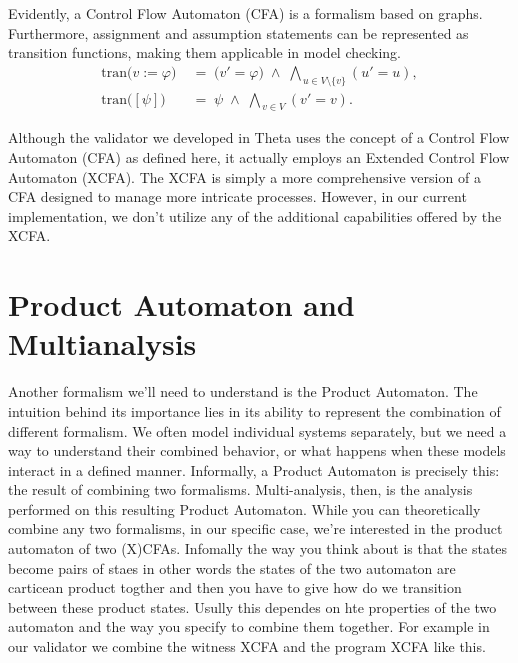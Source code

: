 Evidently, a Control Flow Automaton (CFA) is a formalism based on graphs. 
Furthermore, assignment and assumption statements can be represented as transition functions, 
making them applicable in model checking.
\begin{align}
\mathrm{tran}\bigl(v := \varphi\bigr)
&\;=\;
\bigl(v' = \varphi\bigr)
\;\land\;
\bigwedge_{\,u \in V \setminus \{v\}} (u' = u),
\\
\mathrm{tran}\bigl([\psi]\bigr)
&\;=\;
\psi
\;\land\;
\bigwedge_{\,v \in V} (v' = v).
\end{align}

Although the validator we developed in Theta uses the concept of a Control Flow Automaton (CFA) as 
defined here, it actually employs an Extended Control Flow Automaton (XCFA). The XCFA is simply 
a more comprehensive version of a CFA designed to manage more intricate processes. However, in 
our current implementation, we don't utilize any of the additional capabilities offered by the XCFA.



\section{Product Automaton and Multianalysis}
Another formalism we'll need to understand is the Product Automaton. The intuition behind its 
importance lies in its ability to represent the combination of different formalism. We 
often model individual systems separately, but we need a way to understand their combined behavior, 
or what happens when these models interact in a defined manner. Informally, a Product 
Automaton is precisely this: the result of combining two formalisms. Multi-analysis, then,
is the analysis performed on this resulting Product Automaton. While you can theoretically 
combine any two formalisms, in our specific case, we're interested in the product automaton 
of two (X)CFAs. Infomally the way you think about is that the states become pairs of staes
in other words the states of the two automaton are carticean product togther and then you 
have to give how do we transition between these product states. Usully this dependes on
hte properties of the two automaton and the way you specify to combine them together.
For example in our validator we combine the witness XCFA and the program XCFA like this.

